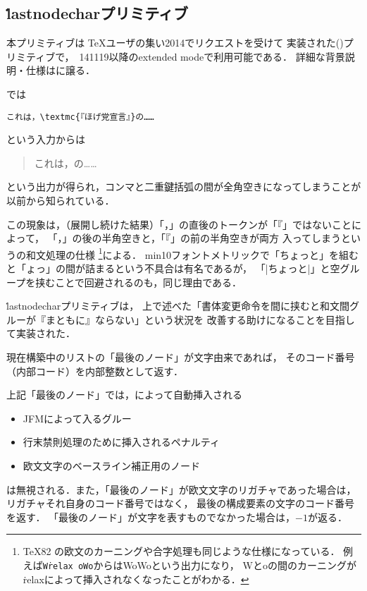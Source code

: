 \documentclass[a4paper,11pt,nomag,dvipdfmx]{jsarticle}
\begin{document}
\subsection{\.{lastnodechar}プリミティブ}
本プリミティブは
\TeX ユーザの集い2014でリクエストを受けて
実装された(\cite{pdfse})プリミティブで，\epTeX~141119以降のextended modeで利用可能である．
詳細な背景説明・仕様は\cite{lnc}に譲る．

\pTeX では
\begin{verbatim}
これは，\textmc{『ほげ党宣言』}の……
\end{verbatim}
という入力からは
\begin{quote}
これは，の……
\end{quote}
という出力が得られ，コンマと二重鍵括弧の間が全角空きになってしまうことが以前から知られている．

この現象は，（展開し続けた結果）「，」の直後のトークンが「『」ではないことによって，
「，」の後の半角空きと，「『」の前の半角空きが両方
入ってしまうという\pTeX の和文処理の仕様
\footnote{%
  \TeX82 の欧文のカーニングや合字処理も同じような仕様になっている．
  例えば\texttt{W\.{relax}\ oWo}からはW\relax oWoという出力になり，
  Wとoの間のカーニングが\.{relax}によって挿入されなくなったことがわかる．
}による．
min10フォントメトリックで「ちょっと」を組むと「ょっ」の間が詰まるという不具合は有名であるが，
「|ちょ{}っと|」と空グループを挟むことで回避されるのも，同じ理由である．

\medskip

\.{lastnodechar}プリミティブは，
上で述べた「書体変更命令を間に挟むと和文間グルーが『まともに』ならない」という状況を
改善する助けになることを目指して実装された．

\begin{cslist}
  現在構築中のリストの「最後のノード」が文字由来であれば，
  そのコード番号（内部コード）を内部整数として返す．

  上記「最後のノード」では，\pTeX によって自動挿入される
  \begin{itemize}
    \item JFMによって入るグルー
    \item 行末禁則処理のために挿入されるペナルティ
    \item 欧文文字のベースライン補正用のノード
  \end{itemize}
  は無視される．また，「最後のノード」が欧文文字のリガチャであった場合は，
  リガチャそれ自身のコード番号ではなく，
  最後の構成要素の文字のコード番号を返す．
  「最後のノード」が文字を表すものでなかった場合は，$-1$が返る．
\end{cslist}
\end{document}
